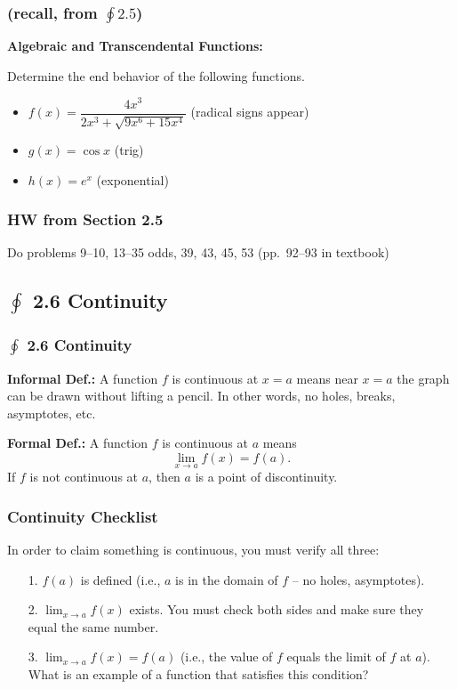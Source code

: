 \documentclass[14pt]{beamer}
\begin{document}
\begin{frame}
\frametitle{(recall, from $\oint 2.5$)}
\small
{\bf Algebraic and Transcendental Functions:}

Determine the end behavior of the following functions.
\begin{itemize}
\item $f(x) = \dfrac{4x^3}{2x^3+\sqrt{9x^6+15x^4}}$ (radical signs appear)

\vspace{1pc}
\item $g(x)=\cos x$ (trig)

\vspace{1pc}
\item $h(x)=e^x$ (exponential)
\end{itemize}
\end{frame}

\begin{frame}
\frametitle{HW from Section 2.5}
Do problems 9--10, 13--35 odds, 39, 43, 45, 53 (pp.\ 92--93 in textbook)
\end{frame}

\subsection[2.6 Continuity]{$\oint$ 2.6 Continuity}

\begin{frame}
\frametitle{$\oint$ 2.6 Continuity}
\small
{\bf Informal Def.:} A function $f$ is continuous at $x=a$ means near $x=a$ the graph can be drawn without lifting a pencil.  In other words, no holes, breaks, asymptotes, etc.

\vspace{1pc}
{\bf Formal Def.:} A function $f$ is continuous at $a$ means
\[\lim_{x \to a} f(x)=f(a).\]  
If $f$ is not continuous at $a$, then $a$ is a point of discontinuity.
\end{frame}

\begin{frame}
\frametitle{Continuity Checklist}
\small
In order to claim something is continuous, you must verify all three:

\begin{itemize}
\item[1.] \alert{$f(a)$ is defined} (i.e., $a$ is in the domain of $f$ -- no holes, asymptotes).

\vspace{0.5pc}
\item[2.] \alert{$\displaystyle\lim_{x \to a} f(x)$ exists.}  You must check both sides and make sure they equal the same number.

\vspace{0.5pc}
\item[3.] \alert{$\displaystyle\lim_{x \to a} f(x) = f(a)$} (i.e., the value of $f$ equals the limit of $f$ at $a$).  What is an example of a function that satisfies this condition?
\end{itemize}
\end{frame}
\end{document}

